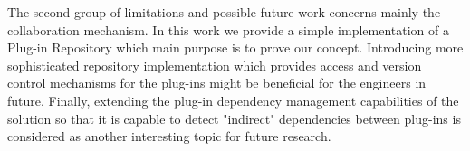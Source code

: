 The second group of limitations and possible future work concerns mainly the collaboration mechanism. In this work we provide a simple implementation of a Plug-in Repository which main purpose is to prove our concept. Introducing more sophisticated repository implementation which provides access and version control mechanisms for the plug-ins might be beneficial for the engineers in future. Finally, extending the plug-in dependency management capabilities of the solution so that it is capable to detect "indirect" dependencies between plug-ins is considered as another interesting topic for future research.

